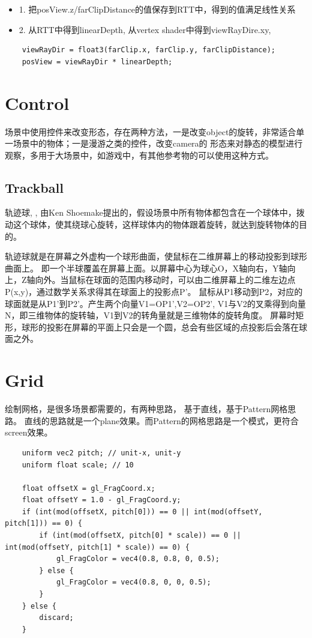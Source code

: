 \begin{itemize}
    \item {1. 把posView.z/farClipDistance的值保存到RTT中，得到的值满足线性关系}
    \item {2. 从RTT中得到linearDepth, 从vertex shader中得到viewRayDire.xy, }
\end{itemize}

\begin{lstlisting}
    viewRayDir = float3(farClip.x, farClip.y, farClipDistance);
    posView = viewRayDir * linearDepth;
\end{lstlisting}

\section{Control}

场景中使用控件来改变形态，存在两种方法，一是改变object的旋转，非常适合单一场景中的物体；一是漫游之类的控件，改变camera的
形态来对静态的模型进行观察，多用于大场景中，如游戏中，有其他参考物的可以使用这种方式。

\subsection{Trackball}

轨迹球\cite{Trackball}, \cite{VirtualTrackballsRevisited}, \cite{CmpArcBall}
由Ken Shoemake提出的，假设场景中所有物体都包含在一个球体中，拨动这个球体，使其绕球心旋转，这样球体内的物体跟着旋转，就达到旋转物体的目的。

轨迹球就是在屏幕之外虚构一个球形曲面，使鼠标在二维屏幕上的移动投影到球形曲面上。
即一个半球覆盖在屏幕上面。以屏幕中心为球心O，X轴向右，Y轴向上，Z轴向外。当鼠标在球面的范围内移动时，可以由二维屏幕上的二维左边点P(x,y)，通过数学关系求得其在球面上的投影点P'。
鼠标从P1移动到P2，对应的球面就是从P1'到P2'。产生两个向量V1=OP1',V2=OP2',  
V1与V2的叉乘得到向量N，即三维物体的旋转轴，V1到V2的转角量就是三维物体的旋转角度。
屏幕时矩形，球形的投影在屏幕的平面上只会是一个圆，总会有些区域的点投影后会落在球面之外。


\section{Grid}
绘制网格，是很多场景都需要的，有两种思路， 基于直线，基于Pattern网格思路。
直线的思路就是一个plane效果。而Pattern的网格思路是一个模式，更符合screen效果。
\begin{lstlisting}
    uniform vec2 pitch; // unit-x, unit-y
    uniform float scale; // 10

    float offsetX = gl_FragCoord.x;
    float offsetY = 1.0 - gl_FragCoord.y;
    if (int(mod(offsetX, pitch[0])) == 0 || int(mod(offsetY, pitch[1])) == 0) {
        if (int(mod(offsetX, pitch[0] * scale)) == 0 || int(mod(offsetY, pitch[1] * scale)) == 0) {
            gl_FragColor = vec4(0.8, 0.8, 0, 0.5);
        } else {
            gl_FragColor = vec4(0.8, 0, 0, 0.5);
        }
    } else {
        discard;
    }
\end{lstlisting}

